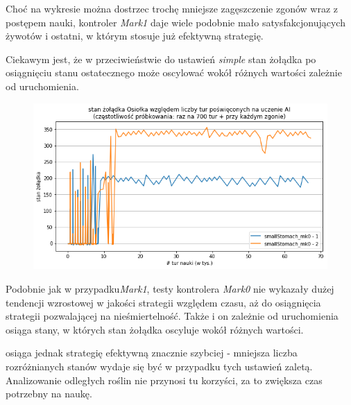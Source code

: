 Choć na wykresie można dostrzec trochę mniejsze zagęszczenie zgonów wraz z postępem nauki, kontroler \textit{Mark1} daje wiele podobnie mało satysfakcjonujących żywotów i ostatni, w którym stosuje już efektywną strategię.

Ciekawym jest, że w przeciwieństwie do ustawień \textit{simple} stan żołądka po osiągnięciu stanu ostatecznego może oscylować wokół różnych wartości zależnie od uruchomienia.

\begin{figure}[H]
    \centering
    \includegraphics[scale=0.6]{Chapters/smallStomach_mk0_hunger}
\end{figure}

Podobnie jak w przypadku\textit{Mark1}, testy kontrolera \textit{Mark0} nie wykazały dużej tendencji wzrostowej w jakości strategii względem czasu, aż do osiągnięcia strategii pozwalającej na nieśmiertelność. Także i on zależnie od uruchomienia osiąga stany, w których stan żołądka oscyluje wokół różnych wartości.

 osiąga jednak strategię efektywną znacznie szybciej - mniejsza liczba rozróżnianych stanów wydaje się być w przypadku tych ustawień zaletą. Analizowanie odległych roślin nie przynosi tu korzyści, za to zwiększa czas potrzebny na naukę.

